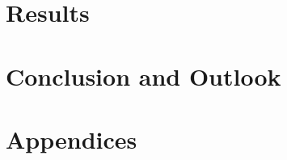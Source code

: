 \documentclass[11pt]{memoir} %
\begin{document}



\chapter[Results]{Results}




%



%



\chapter[Conclusion and Outlook][Conclusion and Outlook]{Conclusion and Outlook}




\backmatter

 



\appendix 
{}

\chapter[Appendices][Appendices]{Appendices}

	
\end{document}
